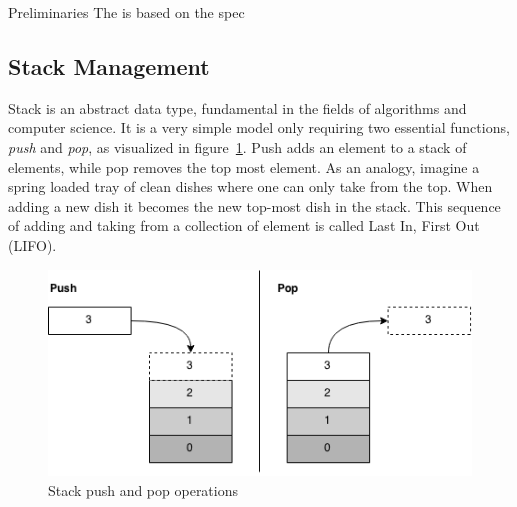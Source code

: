 
Preliminaries
The is based on the spec


\subsection{Stack Management}

Stack is an abstract data type, fundamental in the fields of algorithms and
computer science. It is a very simple model only requiring two essential
functions, {\it push} and {\it pop}, as visualized in
figure~\ref{fig:stack}. Push adds an element to a stack of elements, while pop
removes the top most element. As an analogy, imagine a spring loaded tray of
clean dishes where one can only take from the top. When adding a new dish it
becomes the new top-most dish in the stack. This sequence of adding and taking
from a collection of element is called Last In, First Out (LIFO).
\begin{figure}[h]
  \centering
  \includegraphics[scale=0.6]{images/stack.png}
  \caption{Stack push and pop operations}
  \label{fig:stack}
\end{figure}


